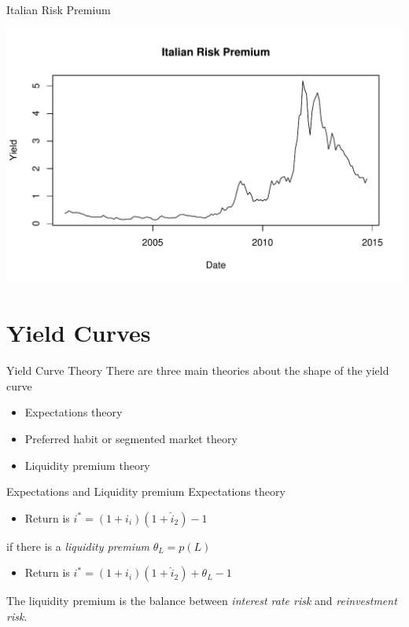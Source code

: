 \documentclass[14pt,xcolor=pdftex,dvipsnames,table]{beamer}\usepackage[]{graphicx}\usepackage[]{color}
\makeatletter
\def\maxwidth{ %
  \ifdim\Gin@nat@width>\linewidth
    \linewidth
  \else
    \Gin@nat@width
  \fi
}
\newenvironment{knitrout}{}{} %
\makeatother
\begin{document}
\begin{frame}{Italian Risk Premium}
\begin{knitrout}
\color{fgcolor}

{\centering \includegraphics[width=\maxwidth]{figure/yield3-1} 

}



\end{knitrout}
\end{frame}


\section{Yield Curves}
\begin{frame}{Yield Curve Theory}
There are three main theories about the shape of the yield curve
\begin{itemize}
\item Expectations theory
\item Preferred habit or segmented market theory
\item Liquidity premium theory
\end{itemize}
\end{frame}

\begin{frame}{Expectations and Liquidity premium}
Expectations theory

\begin{itemize}
\item Return is $i^* = (1+i_i)(1+\hat{i}_2) -1$
\end{itemize}

if there  is a \emph{liquidity premium} $\theta_L = p(L)$

\begin{itemize}
\item Return is $i^* = (1+i_i)(1+\hat{i}_2) + \theta_L -1$ 
\end{itemize}

The liquidity premium is the balance between \emph{interest rate risk} and \emph{reinvestment risk}.

\end{frame}
\end{document}

